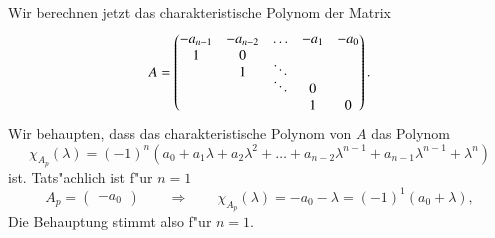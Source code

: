 Wir berechnen jetzt das charakteristische Polynom der Matrix
\begin{equation}
A=\begin{pmatrix}
-a_{n-1}&-a_{n-2}&\dots         &  -a_1&  -a_0\\
       1&       0&              &      &      \\
        &       1&\smash{\ddots}&      &      \\
        &        &\smash{\ddots}&     0&      \\
        &        &              &     1&     0
\end{pmatrix}.
\label{polynomnullstellen:A}
\end{equation}
Wir behaupten, dass das charakteristische Polynom von $A$ 
das Polynom
\[
\chi_{A_p}(\lambda)=
(-1)^n(
a_0+a_1\lambda+a_2\lambda^2+\dots+a_{n-2}\lambda^{n-1}+a_{n-1}\lambda^{n-1}+\lambda^n
)
\]
ist.
Tats"achlich ist f"ur $n=1$ 
\[
A_p=\begin{pmatrix}-a_0\end{pmatrix}
\qquad
\Rightarrow
\qquad
\chi_{A_p}(\lambda)=-a_0-\lambda=(-1)^1(a_0+\lambda),
\]
Die Behauptung stimmt also f"ur $n=1$.

